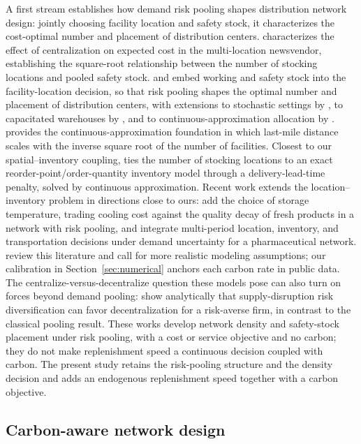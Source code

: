 \documentclass[11pt]{article}
\theoremstyle{definition}
\theoremstyle{remark}
\theoremstyle{plain}
\begin{document}
A first stream establishes how demand risk pooling shapes distribution network design: jointly choosing
facility location and safety stock, it characterizes the cost-optimal number and placement of distribution
centers. \citet{eppen1979effects} characterizes the effect of centralization on expected cost in the
multi-location newsvendor, establishing the square-root relationship between the number of stocking locations
and pooled safety stock. \citet{daskin2002inventory} and \citet{shen2003joint} embed working and safety stock
into the facility-location decision, so that risk pooling shapes the optimal number and placement of
distribution centers, with extensions to stochastic settings by \citet{snyder2007stochastic}, to capacitated
warehouses by \citet{ozsen2008capacitated}, and to continuous-approximation allocation by
\citet{tsao2012continuous}. \citet{daganzo2005logistics} provides the continuous-approximation foundation in
which last-mile distance scales with the inverse square root of the number of facilities. Closest to our spatial--inventory
coupling, \citet{straubert2024continuous} ties the number of stocking locations to an exact
reorder-point/order-quantity inventory model through a delivery-lead-time penalty, solved by continuous
approximation. Recent work extends the location--inventory problem in directions close to ours:
\citet{hu2025location} add the choice of storage temperature, trading cooling cost against the quality decay of
fresh products in a network with risk pooling, and \citet{jalal2026integrated} integrate multi-period location,
inventory, and transportation decisions under demand uncertainty for a pharmaceutical network.
\citet{puttemans2025integration} review this literature and call for more realistic modeling assumptions; our
calibration in Section~\ref{sec:numerical} anchors each carbon rate in public data. The centralize-versus-decentralize question these models pose can also turn on forces beyond
demand pooling: \citet{schmitt2015centralization} show analytically that supply-disruption risk diversification
can favor decentralization for a risk-averse firm, in contrast to the classical pooling result. These works
develop network density and safety-stock placement under risk pooling, with a cost or service objective and no
carbon; they do not make replenishment speed a continuous decision coupled with carbon. The present study
retains the risk-pooling structure and the density decision and adds an endogenous replenishment speed together
with a carbon objective.

\subsection{Carbon-aware network design}
\end{document}
